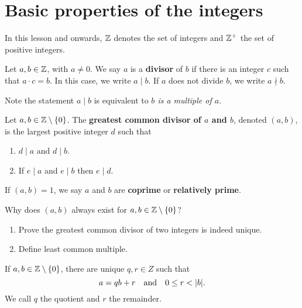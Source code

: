 \documentclass[11pt,a4paper]{article}
\begin{document}
\def\contador{Lesson 1}


\section{Basic properties of the integers}

In this lesson and onwards,   $\mathbb{Z}$ denotes  the set of integers and  $\mathbb{Z}^{+}$  the set of positive integers.

\begin{defi}
Let $a,b\in \mathbb{Z}$, with $a\neq 0$. We say  $a$ is a \textbf{divisor} of $b$ if there is an integer $c$ such that $a\cdot c=b$. In this case, we write $a\mid b.$ 
If $a$ does not divide $b$, we write $a\nmid b$.
\end{defi}

Note the statement \(a\mid b\) is equivalent to \textit{\(b\) is a multiple of \(a\)}.

\begin{defi}
    Let $a,b\in \mathbb{Z}\setminus\{0\}$.
    The \textbf{greatest common divisor of $a$ and $b$}, denoted \((a,b)\), is the  largest positive integer \(d\) such that 
    \begin{enumerate}
        \item $d\mid a$ and $d\mid b.$
        \item If $e\mid a$ and $e\mid b$ then $e\mid d.$
    \end{enumerate}
    If  $(a,b)=1$, we say  $a$ and $b$ are \textbf{coprime} or \textbf{relatively prime}.
\end{defi}

\begin{que}
    Why does $(a,b)$ always exist for $a,b\in \mathbb{Z}\setminus\{0\}$?
\end{que}



\begin{eje}
    \begin{enumerate}[label=(\roman*)]
        \item Prove the greatest common divisor of two integers is indeed unique.
        \item Define  least common multiple.
    \end{enumerate}
    
\end{eje}



\begin{teo}
    If \(a,b\in \mathbb{Z}\setminus\{0\}\), 
    there are unique \(q,r\in Z\)
    such that 
    \[a= qb +r \quad\text{and}\quad 0\leq r < |b|.\]
    We call \(q\) the quotient and \(r\) the remainder.
\end{teo}
\end{document}
